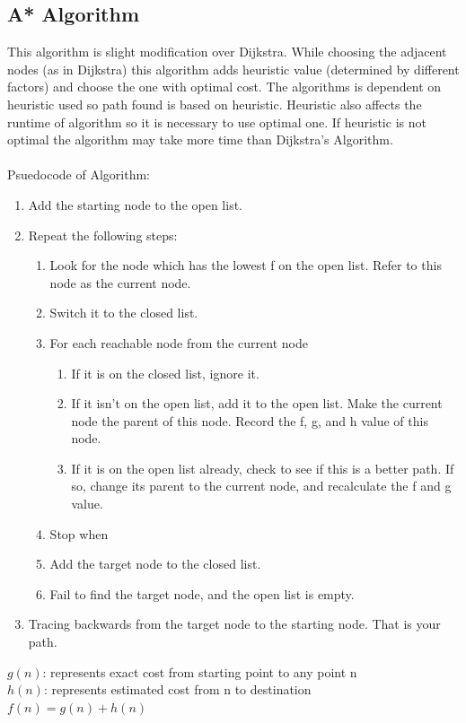 \documentclass[a4paper, 12pt]{article}
\begin{document}
\subsection{A* Algorithm}
\par
\hspace{1cm}
This algorithm is slight modification over Dijkstra. While choosing the adjacent nodes (as in Dijkstra) this algorithm adds heuristic value (determined by different factors) and choose the one with optimal cost. The algorithms is dependent on heuristic used so path found is based on heuristic. Heuristic also affects the runtime of algorithm so it is necessary to use optimal one. If heuristic is not optimal the algorithm may take more time than Dijkstra's Algorithm.
\\
\\
Psuedocode of Algorithm:
\begin{enumerate}
  \item Add the starting node to the open list.
  \item Repeat the following steps:
	\begin{enumerate}
		\item Look for the node which has the lowest f on the open list. Refer to this node as the current node.
		\item Switch it to the closed list.
		\item For each reachable node from the current node
			\begin{enumerate}
			\item If it is on the closed list, ignore it.
			\item If it isn’t on the open list, add it to the open list. Make the current node the parent of this node. Record the f, g, and h value of this node.
			\item If it is on the open list already, check to see if this is a better path. If so, change its parent to the current node, and recalculate the f and g value.
			\end{enumerate}
		\item Stop when
			\item Add the target node to the closed list.
			\item Fail to find the target node, and the open list is empty.
	\end{enumerate}
  \item Tracing backwards from the target node to the starting node. That is your path.
\end{enumerate}
$ g(n) $: represents exact cost from starting point to any point n \\
$ h(n) $: represents estimated cost from n to destination \\
$ f(n)=g(n)+h(n) $
\\
\end{document}
